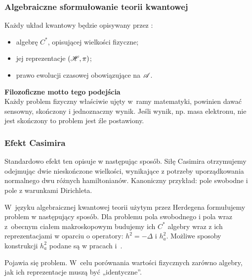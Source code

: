 \documentclass[10pt,t]{beamer}
\begin{document}
\begin{frame}
  \frametitle{Algebraiczne sformułowanie teorii kwantowej}


  Każdy układ kwantowy będzie opisywany przez
  \cite{HaagLocalQuantumPhysics1996}:
  \begin{itemize}
    \RaggedRight

  \item algebrę $C^{ * }$, opisującej wielkości fizyczne;

  \item jej reprezentacje $( \mathcal{H}, \pi )$;

  \item prawo ewolucji czasowej obowiązujące na $\mathcal{A}$.

  \end{itemize}


  \textbf{Filozoficzne motto tego podejścia} \\
  Każdy problem fizyczny właściwie ujęty w~ramy matematyki, powinien dawać
  sensowny, skończony i jednoznaczny wynik. Jeśli wynik, np. masa elektronu,
  nie jest skończony to problem jest źle postawiony.

\end{frame}





\begin{frame}
  \frametitle{Efekt Casimira}


  Standardowo efekt ten opisuje w następując sposób.
  Siłę Casimira otrzymujemy odejmując dwie nieskończone wielkości,
  wynikające z potrzeby uporządkowania normalnego dwu różnych
  hamiltonianów. Kanoniczny przykład: pole swobodne i pole z warunkami
  Dirichleta.

  W~języku algebraicznej kwantowej teorii użytym przez Herdegena formułujemy
  problem w następujący sposób. Dla problemu pola swobodnego i pola wraz
  z~obecnym ciałem makroskopowym budujemy ich $C^{ * }$ algebry wraz z ich
  reprezentacjami w oparciu o operatory: $h^{ 2 } = - \Delta$ i $h^{ 2 }_{ a }$.
  Możliwe sposoby konstrukcji $h^{ 2 }_{ a }$ podane są w pracach
  \cite{HerdegenQuantumBackreationPartI2005}
  i~\cite{HerdegenStopaGlobalVsLocal2010}.

  Pojawia się problem. W~celu porównania wartości fizycznych zarówno
  algebry, jak ich reprezentacje muszą być „identyczne”.

\end{frame}
\end{document}
